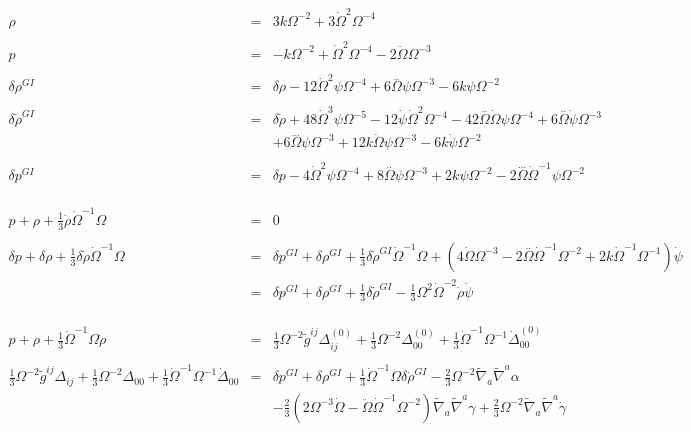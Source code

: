 \documentclass[10pt,letterpaper]{article}
\numberwithin{equation}{section}
\begin{document}
\begin{eqnarray}
\rho &=& 3k\Omega^{-2}+3\dot\Omega^2 \Omega^{-4}
\\ \nonumber\\
p &=&-k\Omega^{-2} + \dot\Omega^2\Omega^{-4} -2\ddot\Omega \Omega^{-3}
\\ \nonumber\\
\delta \rho^{GI}&=&\delta \rho - 12 \dot{\Omega}^2 \psi \Omega^{-4} + 6 \overset{..}{\Omega} \psi \Omega^{-3} - 6 k \psi \Omega^{-2}
\\ \nonumber\\
\delta \dot\rho^{GI} &=&
\delta \dot{\rho} + 48 \dot{\Omega}^3 \psi \Omega^{-5} - 12 \dot{\psi} \dot{\Omega}^2 \Omega^{-4} - 42 \overset{..}{\Omega} \dot{\Omega} \psi \Omega^{-4} + 6 \overset{..}{\Omega} \dot{\psi} \Omega^{-3} 
\nonumber\\
&& + 6 \overset{...}{\Omega} \psi \Omega^{-3} + 12 k \dot{\Omega} \psi \Omega^{-3} - 6 k \dot{\psi} \Omega^{-2}
\\ \nonumber\\ 
\delta p^{GI}&=&\delta p - 4 \dot{\Omega}^2 \psi \Omega^{-4} + 8 \overset{..}{\Omega} \psi \Omega^{-3} + 2 k \psi \Omega^{-2} - 2 \overset{...}{\Omega} \dot{\Omega}^{-1} \psi \Omega^{-2}
\\ \nonumber\\ \\ \nonumber\\
p +\rho + \tfrac{1}{3} \dot \rho \dot{\Omega}^{-1} \Omega &=&0
\\ \nonumber\\
\delta p +\delta \rho +  \tfrac{1}{3} \delta \dot{\rho} \dot{\Omega}^{-1} \Omega 
&=&\delta p^{GI}{} + \delta \rho^{GI}{} + \tfrac{1}{3} \delta \dot{\rho}^{GI}{} \dot{\Omega}^{-1} \Omega + (4  \dot{\Omega} \Omega^{-3} - 2 \overset{..}{\Omega}  \dot{\Omega}^{-1} \Omega^{-2} + 2 k  \dot{\Omega}^{-1} \Omega^{-1} )\dot{\psi}
\nonumber\\
&=& \delta p^{GI}{} + \delta \rho^{GI}{} + \tfrac{1}{3} \delta \dot{\rho}^{GI}{} -\tfrac13 \Omega^2 \dot\Omega^{-2} \dot\rho \dot\psi
\\ \nonumber\\ \\ \nonumber\\
 p+\rho+\tfrac13 \dot\Omega^{-1}\Omega\dot\rho &=&\tfrac13 \Omega^{-2}\tilde g^{ij} \Delta^{(0)}_{ij} + \tfrac13 \Omega^{-2}\Delta^{(0)}_{00} + \tfrac13 \dot\Omega^{-1}\Omega^{-1} \dot \Delta^{(0)}_{00}
 \\ \nonumber\\
\tfrac13 \Omega^{-2}\tilde g^{ij} \Delta_{ij} + \tfrac13 \Omega^{-2}\Delta_{00} + \tfrac13 \dot\Omega^{-1}\Omega^{-1} \dot \Delta_{00} &=& \delta p^{GI} + \delta \rho^{GI} +\tfrac13 \dot\Omega^{-1}\Omega \delta\dot\rho^{GI}
-\tfrac23 \Omega^{-2}\tilde\nabla_a\tilde\nabla^a \alpha
\nonumber\\
&&-\tfrac23(2\Omega^{-3}\dot\Omega 
- \ddot\Omega \dot\Omega^{-1}\Omega^{-2})\tilde\nabla_a\tilde\nabla^a \gamma + \tfrac23 \Omega^{-2}\tilde\nabla_a\tilde\nabla^a \dot\gamma  
\end{eqnarray}
\end{document}
